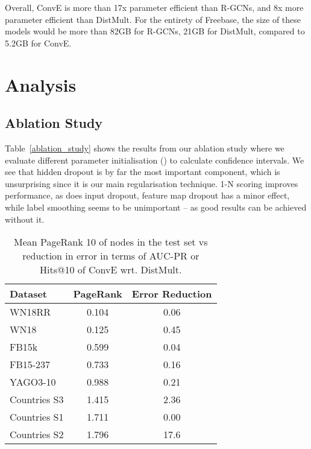 \documentclass[letterpaper]{article}
\begin{document}
Overall, ConvE is more than 17x parameter efficient than R-GCNs, and 8x more parameter efficient than DistMult.
For the entirety of Freebase, the size of these models would be more than 82GB for R-GCNs, 21GB for DistMult, compared to 5.2GB for ConvE.


\section{Analysis}

\subsection{Ablation Study}

Table~\ref{ablation_study} shows the results from our ablation study where we evaluate different parameter initialisation () to calculate confidence intervals.
We see that hidden dropout is by far the most important component, which is unsurprising since it is our main regularisation technique.
1-N scoring improves performance, as does input dropout, feature map dropout has a minor effect, while label smoothing seems to be unimportant -- as good results can be achieved without it.


\begin{center}
\begin{table}[ht]
	\caption{Mean PageRank 10 of nodes in the test set vs reduction in error in terms of AUC-PR or Hits@10 of ConvE wrt. DistMult.}
	\label{testset_pagerank}
	\begin{center}
    	\begin{tabular}{lcc}
    	    \toprule       
    		Dataset & PageRank & Error Reduction \\
    		\midrule	    
            WN18RR & 0.104 & 0.06    \\
            WN18 & 0.125 & 0.45    \\
            FB15k & 0.599 & 0.04    \\
            FB15-237 & 0.733 & 0.16    \\
            YAGO3-10 & 0.988 & 0.21    \\
            Countries S3 & 1.415 & 2.36    \\
            Countries S1 & 1.711 & 0.00    \\
            Countries S2 & 1.796 & 17.6    \\
    		\bottomrule
    	\end{tabular}
	\end{center}
\end{table}
\end{center}
\end{document}
